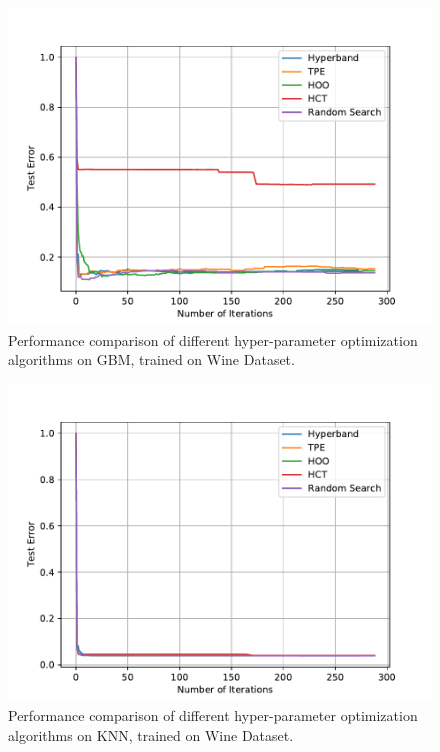 \documentclass[runningheads,a4paper]{llncs}
\begin{document}
\begin{figure}[ht]
    \centering
    \includegraphics[scale=0.8]{img/uci/gbm_0.pdf}
    \caption{Performance comparison of different hyper-parameter optimization algorithms on GBM, trained on Wine Dataset.}
    \label{gbm_0}
\end{figure}

\begin{figure}[ht]
    \centering
    \includegraphics[scale=0.8]{img/uci/knn_0.pdf}
    \caption{Performance comparison of different hyper-parameter optimization algorithms on KNN, trained on Wine Dataset.}
    \label{knn_0}
\end{figure}
\end{document}
